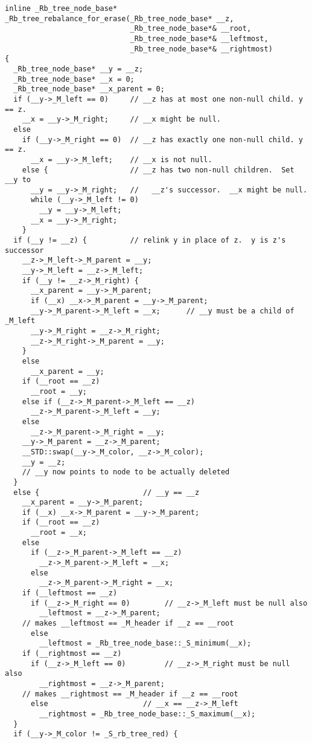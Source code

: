 \documentclass{article}
\begin{document}
\begin{lstlisting}
inline _Rb_tree_node_base*
_Rb_tree_rebalance_for_erase(_Rb_tree_node_base* __z,
                             _Rb_tree_node_base*& __root,
                             _Rb_tree_node_base*& __leftmost,
                             _Rb_tree_node_base*& __rightmost)
{
  _Rb_tree_node_base* __y = __z;
  _Rb_tree_node_base* __x = 0;
  _Rb_tree_node_base* __x_parent = 0;
  if (__y->_M_left == 0)     // __z has at most one non-null child. y == z.
    __x = __y->_M_right;     // __x might be null.
  else
    if (__y->_M_right == 0)  // __z has exactly one non-null child. y == z.
      __x = __y->_M_left;    // __x is not null.
    else {                   // __z has two non-null children.  Set __y to
      __y = __y->_M_right;   //   __z's successor.  __x might be null.
      while (__y->_M_left != 0)
        __y = __y->_M_left;
      __x = __y->_M_right;
    }
  if (__y != __z) {          // relink y in place of z.  y is z's successor
    __z->_M_left->_M_parent = __y; 
    __y->_M_left = __z->_M_left;
    if (__y != __z->_M_right) {
      __x_parent = __y->_M_parent;
      if (__x) __x->_M_parent = __y->_M_parent;
      __y->_M_parent->_M_left = __x;      // __y must be a child of _M_left
      __y->_M_right = __z->_M_right;
      __z->_M_right->_M_parent = __y;
    }
    else
      __x_parent = __y;  
    if (__root == __z)
      __root = __y;
    else if (__z->_M_parent->_M_left == __z)
      __z->_M_parent->_M_left = __y;
    else 
      __z->_M_parent->_M_right = __y;
    __y->_M_parent = __z->_M_parent;
    __STD::swap(__y->_M_color, __z->_M_color);
    __y = __z;
    // __y now points to node to be actually deleted
  }
  else {                        // __y == __z
    __x_parent = __y->_M_parent;
    if (__x) __x->_M_parent = __y->_M_parent;   
    if (__root == __z)
      __root = __x;
    else 
      if (__z->_M_parent->_M_left == __z)
        __z->_M_parent->_M_left = __x;
      else
        __z->_M_parent->_M_right = __x;
    if (__leftmost == __z) 
      if (__z->_M_right == 0)        // __z->_M_left must be null also
        __leftmost = __z->_M_parent;
    // makes __leftmost == _M_header if __z == __root
      else
        __leftmost = _Rb_tree_node_base::_S_minimum(__x);
    if (__rightmost == __z)  
      if (__z->_M_left == 0)         // __z->_M_right must be null also
        __rightmost = __z->_M_parent;  
    // makes __rightmost == _M_header if __z == __root
      else                      // __x == __z->_M_left
        __rightmost = _Rb_tree_node_base::_S_maximum(__x);
  }
  if (__y->_M_color != _S_rb_tree_red) { 

\end{lstlisting}
\end{document}
